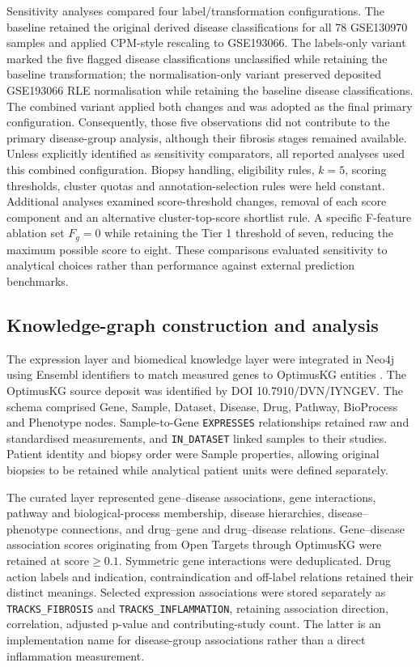 \documentclass[11pt,a4paper]{article}
\begin{document}
Sensitivity analyses compared four label/transformation configurations. The baseline retained the original derived disease classifications for all 78 GSE130970 samples and applied CPM-style rescaling to GSE193066. The labels-only variant marked the five flagged disease classifications unclassified while retaining the baseline transformation; the normalisation-only variant preserved deposited GSE193066 RLE normalisation while retaining the baseline disease classifications. The combined variant applied both changes and was adopted as the final primary configuration. Consequently, those five observations did not contribute to the primary disease-group analysis, although their fibrosis stages remained available. Unless explicitly identified as sensitivity comparators, all reported analyses used this combined configuration. Biopsy handling, eligibility rules, \(k=5\), scoring thresholds, cluster quotas and annotation-selection rules were held constant. Additional analyses examined score-threshold changes, removal of each score component and an alternative cluster-top-score shortlist rule. A specific F-feature ablation set \(F_g=0\) while retaining the Tier 1 threshold of seven, reducing the maximum possible score to eight. These comparisons evaluated sensitivity to analytical choices rather than performance against external prediction benchmarks.

\subsection*{Knowledge-graph construction and analysis}
The expression layer and biomedical knowledge layer were integrated in Neo4j using Ensembl identifiers to match measured genes to OptimusKG entities \cite{ref5}. The OptimusKG source deposit was identified by DOI 10.7910/DVN/IYNGEV. The schema comprised Gene, Sample, Dataset, Disease, Drug, Pathway, BioProcess and Phenotype nodes. Sample-to-Gene \texttt{EXPRESSES} relationships retained raw and standardised measurements, and \texttt{IN\_DATASET} linked samples to their studies. Patient identity and biopsy order were Sample properties, allowing original biopsies to be retained while analytical patient units were defined separately.

The curated layer represented gene--disease associations, gene interactions, pathway and biological-process membership, disease hierarchies, disease--phenotype connections, and drug--gene and drug--disease relations. Gene--disease association scores originating from Open Targets through OptimusKG were retained at \(\mathrm{score}\geq0.1\). Symmetric gene interactions were deduplicated. Drug action labels and indication, contraindication and off-label relations retained their distinct meanings. Selected expression associations were stored separately as \texttt{TRACKS\_FIBROSIS} and \texttt{TRACKS\_INFLAMMATION}, retaining association direction, correlation, adjusted p-value and contributing-study count. The latter is an implementation name for disease-group associations rather than a direct inflammation measurement. 
\end{document}

